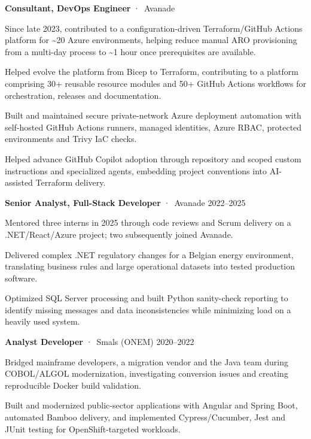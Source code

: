 \textbf{Consultant, DevOps Engineer} \textcolor{ResumeSlate}{·\ Avanade} \hfill \textcolor{ResumeSlate}{\ExperienceCurrentDates}\par
\begin{resumeItems}
\item Since late 2023, contributed to a configuration-driven Terraform/GitHub Actions platform for \textasciitilde20 Azure environments, helping reduce manual ARO provisioning from a multi-day process to \textasciitilde1 hour once prerequisites are available.
\item Helped evolve the platform from Bicep to Terraform, contributing to a platform comprising 30+ reusable resource modules and 50+ GitHub Actions workflows for orchestration, releases and documentation.
\item Built and maintained secure private-network Azure deployment automation with self-hosted GitHub Actions runners, managed identities, Azure RBAC, protected environments and Trivy IaC checks.
\item Helped advance GitHub Copilot adoption through repository and scoped custom instructions and specialized agents, embedding project conventions into AI-assisted Terraform delivery.
\end{resumeItems}
\textbf{Senior Analyst, Full-Stack Developer} \textcolor{ResumeSlate}{·\ Avanade} \hfill \textcolor{ResumeSlate}{2022--2025}\par
\begin{resumeItems}
\item Mentored three interns in 2025 through code reviews and Scrum delivery on a .NET/React/Azure project; two subsequently joined Avanade.
\item Delivered complex .NET regulatory changes for a Belgian energy environment, translating business rules and large operational datasets into tested production software.
\item Optimized SQL Server processing and built Python sanity-check reporting to identify missing messages and data inconsistencies while minimizing load on a heavily used system.
\end{resumeItems}
\textbf{Analyst Developer} \textcolor{ResumeSlate}{·\ Smals (ONEM)} \hfill \textcolor{ResumeSlate}{2020--2022}\par
\begin{resumeItems}
\item Bridged mainframe developers, a migration vendor and the Java team during COBOL/ALGOL modernization, investigating conversion issues and creating reproducible Docker build validation.
\item Built and modernized public-sector applications with Angular and Spring Boot, automated Bamboo delivery, and implemented Cypress/Cucumber, Jest and JUnit testing for OpenShift-targeted workloads.
\end{resumeItems}
